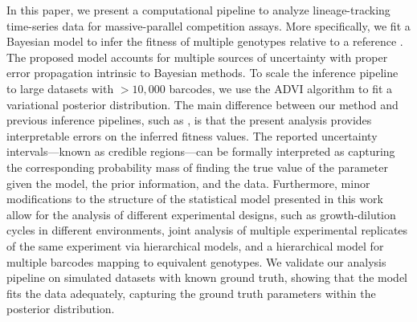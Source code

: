 \documentclass[
]{scrartcl}
\begin{document}
\begin{refsegment}
In this paper, we present a computational pipeline to analyze
lineage-tracking time-series data for massive-parallel competition
assays. More specifically, we fit a Bayesian model to infer the fitness
of multiple genotypes relative to a reference
\autocite{kinsler2020,ascensao2023}. The proposed model accounts for
multiple sources of uncertainty with proper error propagation intrinsic
to Bayesian methods. To scale the inference pipeline to large datasets
with \(> 10,000\) barcodes, we use the ADVI algorithm
\autocite{kucukelbir2016} to fit a variational posterior distribution.
The main difference between our method and previous inference pipelines,
such as \textcite{li2023}, is that the present analysis provides
interpretable errors on the inferred fitness values. The reported
uncertainty intervals---known as credible regions---can be formally
interpreted as capturing the corresponding probability mass of finding
the true value of the parameter given the model, the prior information,
and the data. Furthermore, minor modifications to the structure of the
statistical model presented in this work allow for the analysis of
different experimental designs, such as growth-dilution cycles in
different environments, joint analysis of multiple experimental
replicates of the same experiment via hierarchical models, and a
hierarchical model for multiple barcodes mapping to equivalent
genotypes. We validate our analysis pipeline on simulated datasets with
known ground truth, showing that the model fits the data adequately,
capturing the ground truth parameters within the posterior distribution.


\end{refsegment}
\end{document}
